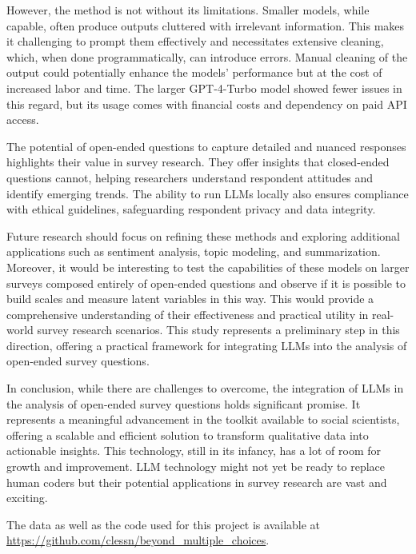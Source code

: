 \documentclass[
  authoryear,
  preprint,
  3p]{elsarticle}
\begin{document}
However, the method is not without its limitations. Smaller models,
while capable, often produce outputs cluttered with irrelevant
information. This makes it challenging to prompt them effectively and
necessitates extensive cleaning, which, when done programmatically, can
introduce errors. Manual cleaning of the output could potentially
enhance the models' performance but at the cost of increased labor and
time. The larger GPT-4-Turbo model showed fewer issues in this regard,
but its usage comes with financial costs and dependency on paid API
access.

The potential of open-ended questions to capture detailed and nuanced
responses highlights their value in survey research. They offer insights
that closed-ended questions cannot, helping researchers understand
respondent attitudes and identify emerging trends. The ability to run
LLMs locally also ensures compliance with ethical guidelines,
safeguarding respondent privacy and data integrity.

Future research should focus on refining these methods and exploring
additional applications such as sentiment analysis, topic modeling, and
summarization. Moreover, it would be interesting to test the
capabilities of these models on larger surveys composed entirely of
open-ended questions and observe if it is possible to build scales and
measure latent variables in this way. This would provide a comprehensive
understanding of their effectiveness and practical utility in real-world
survey research scenarios. This study represents a preliminary step in
this direction, offering a practical framework for integrating LLMs into
the analysis of open-ended survey questions.

In conclusion, while there are challenges to overcome, the integration
of LLMs in the analysis of open-ended survey questions holds significant
promise. It represents a meaningful advancement in the toolkit available
to social scientists, offering a scalable and efficient solution to
transform qualitative data into actionable insights. This technology,
still in its infancy, has a lot of room for growth and improvement. LLM
technology might not yet be ready to replace human coders but their
potential applications in survey research are vast and exciting.

The data as well as the code used for this project is available at
\url{https://github.com/clessn/beyond_multiple_choices}.

\newpage{}


\renewcommand\refname{References}
  
\end{document}

